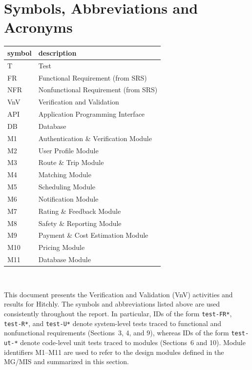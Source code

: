 \section{Symbols, Abbreviations and Acronyms}

\renewcommand{\arraystretch}{1.2}
\begin{tabular}{l l} 
  \toprule		
  \textbf{symbol} & \textbf{description}\\
  \midrule 
  T & Test\\
  FR & Functional Requirement (from SRS)\\
  NFR & Nonfunctional Requirement (from SRS)\\
  VnV & Verification and Validation\\
  API & Application Programming Interface\\
  DB & Database\\
  M1 & Authentication \& Verification Module\\
  M2 & User Profile Module\\
  M3 & Route \& Trip Module\\
  M4 & Matching Module\\
  M5 & Scheduling Module\\
  M6 & Notification Module\\
  M7 & Rating \& Feedback Module\\
  M8 & Safety \& Reporting Module\\
  M9 & Payment \& Cost Estimation Module\\
  M10 & Pricing Module\\
  M11 & Database Module\\
  \bottomrule
\end{tabular}\\

\newpage

\tableofcontents

\listoftables %

\listoffigures %

\newpage


This document presents the Verification and Validation (VnV) activities and results for Hitchly. The symbols and abbreviations listed above are used consistently throughout the report. In particular, IDs of the form \texttt{test-FR*}, \texttt{test-R*}, and \texttt{test-U*} denote system-level tests traced to functional and nonfunctional requirements (Sections~3, 4, and 9), whereas IDs of the form \texttt{test-ut-*} denote code-level unit tests traced to modules (Sections~6 and 10). Module identifiers M1--M11 are used to refer to the design modules defined in the MG/MIS and summarized in this section.
